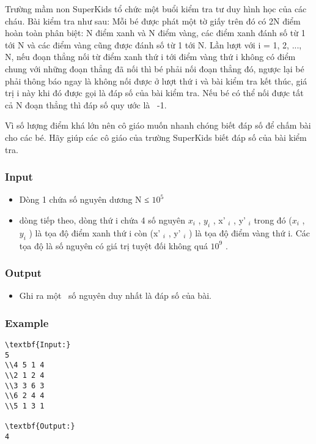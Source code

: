 



   Trường mầm non SuperKids tổ chức một buổi kiểm tra tư duy hình học của các cháu. Bài kiểm tra như sau: Mỗi bé được phát một tờ giấy trên đó có 2N điểm hoàn toàn phân biệt: N điểm xanh và N điểm vàng, các điểm xanh đánh số từ 1 tới N và các điểm vàng cũng được đánh số từ 1 tới N. Lần lượt với i = 1, 2, ..., N, nếu đoạn thẳng nối từ điểm xanh thứ i tới điểm vàng thứ i không có điểm chung với những đoạn thẳng đã nối thì bé phải nối đoạn thẳng đó, ngược lại bé phải thông báo ngay là không nối được ở lượt thứ i và bài kiểm tra kết thúc, giá trị i này khi đó được gọi là đáp số của bài kiểm tra. Nếu bé có thể nối được tất cả N đoạn thẳng thì đáp số quy ước là  -1.  

   Vì số lượng điểm khá lớn nên cô giáo muốn nhanh chóng biết đáp số để chấm bài cho các bé. Hãy giúp các cô giáo của trường SuperKids biết đáp số của bài kiểm tra.  

\subsubsection{   Input  }
\begin{itemize}
	\item     Dòng 1 chứa số nguyên dương N ≤ $10^{5}$
	\item     dòng tiếp theo, dòng thứ i chứa 4 số nguyên $x_{i}$    , $y_{i}$    , x'    $_     i    $    , y'    $_     i    $    trong đó ($x_{i}$    , $y_{i}$    ) là tọa độ điểm xanh thứ i còn (x'    $_     i    $    , y'    $_     i    $    ) là tọa độ điểm vàng thứ i. Các tọa độ là số nguyên có giá trị tuyệt đối không quá $10^{9}$    .   
\end{itemize}

\subsubsection{   Output  }
\begin{itemize}
	\item     Ghi ra một  số nguyên duy nhất là đáp số của bài.   
\end{itemize}

\subsubsection{   Example  }
\begin{verbatim}
\textbf{Input:}
5 
\\4 5 1 4 
\\2 1 2 4 
\\3 3 6 3 
\\6 2 4 4 
\\5 1 3 1

\textbf{Output:}
4
\end{verbatim}
